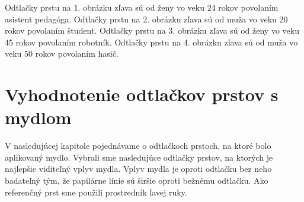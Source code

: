 \documentclass[12pt,a4paper,titlepage,final]{article}
\begin{document}
Odtlačky prstu na 1. obrázku zľava sú od ženy vo veku 24 rokov povolaním asistent pedagóga.
Odtlačky prstu na 2. obrázku zľava sú od muža vo veku 20 rokov povolaním študent.
Odtlačky prstu na 3. obrázku zľava sú od ženy vo veku 45 rokov povolaním robotník.
Odtlačky prstu na 4. obrázku zľava sú od muža vo veku 50 rokov povolaním hasič.

\section{Vyhodnotenie odtlačkov prstov s mydlom}
V nasledujúcej kapitole pojednávame o odtlačkoch prstoch, na ktoré bolo aplikovaný mydlo. Vybrali sme nasledujúce odtlačky prstov, na ktorých je najlepšie viditeľný vplyv mydla. Vplyv mydla je oproti odtlačku bez neho badateľný tým, že papilárne línie sú širšie oproti bežnému odtlačku. Ako referenčný prst sme použili prostredník ľavej ruky.
\end{document}
